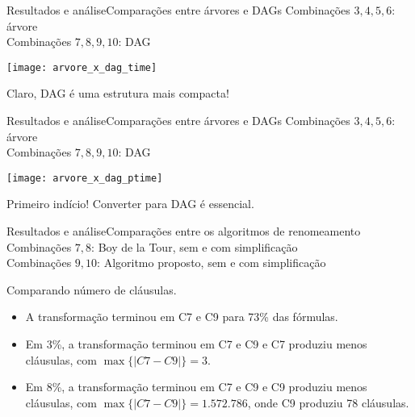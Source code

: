\begin{frame}{Resultados e análise}{Comparações entre árvores e DAGs}
	Combinações $3,4,5,6$: árvore\\
	Combinações $7,8,9,10$: DAG
	
	\vspace{-.4cm}
	\pause
	\begin{center}
		\texttt{[image: arvore\_x\_dag\_time]}
	\end{center}
	
	\vspace{-.6cm}
	\pause Claro, DAG é uma estrutura mais compacta!
\end{frame}

\begin{frame}{Resultados e análise}{Comparações entre árvores e DAGs}
	Combinações $3,4,5,6$: árvore\\
	Combinações $7,8,9,10$: DAG
	
	\vspace{-.4cm}
	\pause
	\begin{center}
		\texttt{[image: arvore\_x\_dag\_ptime]}
	\end{center}
	
	\vspace{-.6cm}
	\pause Primeiro indício! \pause Converter para DAG é essencial.
\end{frame}

\begin{frame}{Resultados e análise}{Comparações entre os algoritmos de renomeamento}
	Combinações $7,8$: Boy de la Tour, sem e com simplificação\\
	Combinações $9,10$: Algoritmo proposto, sem e com simplificação
	
	\pause \begin{center}Comparando número de cláusulas.\end{center}
	\begin{itemize}
		\pause\item A transformação terminou em C7 e C9 para 73\% das fórmulas.
		\pause\item Em 3\%, a transformação terminou em C7 e C9 e C7 produziu menos cláusulas, com $\max \{|C7-C9| \} = 3$.
		\pause\item Em 8\%, a transformação terminou em C7 e C9 e C9 produziu menos cláusulas, com $\max \{|C7-C9| \} = 1.572.786$, onde C9 produziu 78 cláusulas.
	\end{itemize}
\end{frame}

